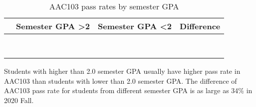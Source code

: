 \documentclass[
  letterpaper,
  DIV=11,
  numbers=noendperiod]{scrartcl}
\begin{document}
\begin{table}

\caption{AAC103 pass rates by semester GPA}
\centering
\fontsize{12}{14}\selectfont
\begin{tabular}[t]{>{\centering\arraybackslash}p{7em}>{\centering\arraybackslash}p{4em}>{\centering\arraybackslash}p{4em}>{\centering\arraybackslash}p{4em}}
\toprule
 & Semester GPA >2 & Semester GPA <2 & Difference\\
\midrule
\cellcolor{white}{\textcolor{black}{2018 Fall}} & \cellcolor{white}{\textcolor{black}{76\%}} & \cellcolor{white}{\textcolor{black}{67\%}} & \cellcolor{white}{9\%}\\
\cellcolor{white}{\textcolor{black}{2019 Fall}} & \cellcolor[HTML]{ffe099}{\textcolor{black}{86\%}} & \cellcolor{white}{\textcolor{black}{73\%}} & \cellcolor{white}{13\%}\\
\cellcolor{white}{\textcolor{black}{2019 Spring}} & \cellcolor[HTML]{ffe099}{\textcolor{black}{87\%}} & \cellcolor{white}{\textcolor{black}{75\%}} & \cellcolor{white}{12\%}\\
\cellcolor{white}{\textcolor{black}{2020 Fall}} & \cellcolor[HTML]{ffe099}{\textcolor{black}{88\%}} & \cellcolor{white}{\textcolor{black}{54\%}} & \cellcolor[HTML]{aaaaaa}{34\%}\\
\cellcolor{white}{\textcolor{black}{2020 Spring}} & \cellcolor[HTML]{ffe099}{\textcolor{black}{83\%}} & \cellcolor{white}{\textcolor{black}{74\%}} & \cellcolor{white}{10\%}\\
\addlinespace
\cellcolor{white}{\textcolor{black}{2021 Fall}} & \cellcolor[HTML]{FFCB4F}{\textcolor{black}{93\%}} & \cellcolor[HTML]{FFCB4F}{\textcolor{black}{93\%}} & \cellcolor{white}{0\%}\\
\cellcolor{white}{\textcolor{black}{2021 Spring}} & \cellcolor[HTML]{ffe099}{\textcolor{black}{89\%}} & \cellcolor{white}{\textcolor{black}{70\%}} & \cellcolor[HTML]{cccccc}{19\%}\\
\cellcolor{white}{\textcolor{black}{2022 Spring}} & \cellcolor[HTML]{ffe099}{\textcolor{black}{86\%}} & \cellcolor{white}{\textcolor{black}{64\%}} & \cellcolor[HTML]{cccccc}{22\%}\\
\bottomrule
\end{tabular}
\end{table}

Students with higher than 2.0 semester GPA usually have higher pass rate
in AAC103 than students with lower than 2.0 semester GPA. The difference
of AAC103 pass rate for students from different semester GPA is as large
as 34\% in 2020 Fall.
\end{document}
